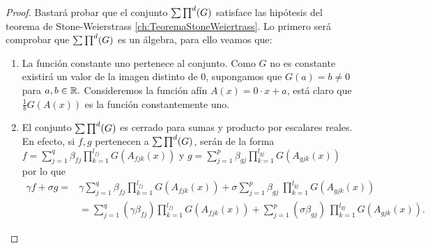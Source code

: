 \begin{proof}
    Bastará probar que el conjunto $\sum \prod^d (G)$ satisface las hipótesis del teorema de
     Stone-Weierstrass \ref{ch:TeoremaStoneWeiertrass}.
    Lo primero será comprobar que $\sum \prod^d (G)$ es un álgebra, para ello veamos que:   

    \begin{enumerate}
        \item La función constante uno pertenece al conjunto. 
        Como $G$ no es constante existirá un valor de la imagen distinto de $0$, supongamos que $G(a)= b \neq 0$ para $a,b \in \mathbb{R}.$
        Consideremos la función afín $A(x) = 0 \cdot x + a$, está claro que $\frac{1}{b}G(A(x))$ es la función constantemente uno. 
        \item El conjunto $\sum \prod^d (G)$ es cerrado para sumas y producto por escalares reales. 
        En efecto, si $f,g$ pertenecen a  $\sum \prod^d (G)$, serán de la forma
         $f = \sum_{j = 1} ^q  \beta_{fj} \prod_{k=1}^{l_{fj}}  G(A_{fjk}(x))$ y 
        $g = \sum_{j = 1} ^p  \beta_{gj} \prod_{k=1}^{l_{gj}}G(A_{gjk}(x))$  por lo que
        \begin{equation}
            \begin{split}
                \gamma f+ \sigma g =& \gamma \sum_{j = 1} ^q  \beta_{fj} \prod_{k=1}^{l_{fj}}  G(A_{fjk}(x)) + 
                \sigma \sum_{j = 1} ^p  \beta_{gj} \ \prod_{k=1}^{l_{gj}}G(A_{gjk}(x)) \\
                & = \sum_{j = 1} ^q  (\gamma \beta_{fj})  \prod_{k=1}^{l_{fj}}  G(A_{fjk}(x)) + 
                \sum_{j = 1} ^p  (\sigma \beta_{gj}) \ \prod_{k=1}^{l_{gj}}G(A_{gjk}(x)).
            \end{split}
        \end{equation}
        

\end{enumerate}
\end{proof}

